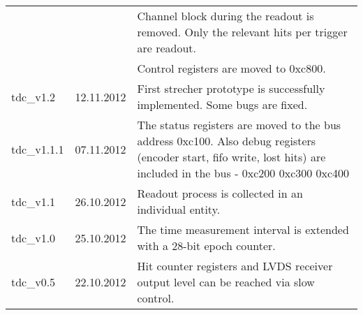 \documentclass[11pt]{article}
\begin{document}
\begin{center}
\begin{longtable}{|l|l|p{10cm}|}
                   &                         &  Channel block during the readout is removed. Only the relevant hits per trigger are readout.  \\
                   &                         &  Control registers are moved to 0xc800.                                            \\
\hline
 tdc\_v1.2         &             12.11.2012  &  First strecher prototype is successfully implemented. Some bugs are fixed.        \\
\hline
 tdc\_v1.1.1       &             07.11.2012  &  The status registers are moved to the bus address 0xc100. Also debug registers (encoder start, fifo write, lost hits) are included in the bus - 0xc200 0xc300 0xc400  \\
\hline
 tdc\_v1.1         &             26.10.2012  &  Readout process is collected in an individual entity.                             \\
\hline
 tdc\_v1.0         &             25.10.2012  &  The time measurement interval is extended with a 28-bit epoch counter.            \\
\hline
 tdc\_v0.5         &             22.10.2012  &  Hit counter registers and LVDS receiver output level can be reached via slow control.  \\
\hline
\end{longtable}

\end{center}
\end{document}
